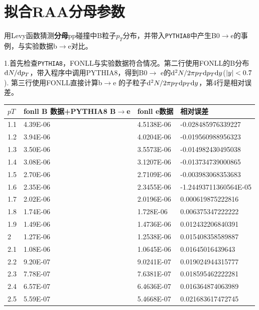 \documentclass{ctexart}
\begin{document}
\section{拟合RAA分母参数} %
\label{sec:拟合raa分母参数}

用Levy函数猜测\textbf{分母}pp碰撞中B粒子$p_T$分布，并带入\texttt{PYTHIA8}中产生B0$\to$e的事例，与实验数据b$\to$e\cite{Aidala:2019hib}对比。\par
1.首先检查\texttt{PYTHIA8}，FONLL与实验数据符合情况。第二行使用FONLL的B分布$\mathrm{d} N/\mathrm{d} p_T$，带入程序中调用PYTHIA8，得到B0$\to$ e的$\mathrm{d} ^2N/2\pi p_T\mathrm{d} p_T\mathrm{d} y$(${\abs{y}<0.7}$). 第三行使用FONLL直接计算b$\to$e 的子粒子$\mathrm{d} ^2N/2\pi p_T\mathrm{d} p_T\mathrm{d} y$，第4行是相对误差。
\begin{longtable}{l|lll}\hline
$pT$ & fonll B 数据+PYTHIA8 B$\to$e & fonll e数据  & 相对误差                  \\\hline
1.1  & 4.39E-06                  & 4.5138E-06 & -0.028485976339227    \\
1.2  & 3.94E-06                  & 4.0204E-06 & -0.019560988956323    \\
1.3  & 3.50E-06                  & 3.5573E-06 & -0.014982430495038    \\
1.4  & 3.08E-06                  & 3.1207E-06 & -0.013734739000865    \\
1.5  & 2.70E-06                  & 2.7109E-06 & -0.003983068353683    \\
1.6  & 2.35E-06                  & 2.3455E-06 & -1.24493711360564E-05 \\
1.7  & 2.02E-06                  & 2.0196E-06 & 0.000619875222816     \\
1.8  & 1.74E-06                  & 1.728E-06  & 0.006375347222222     \\
1.9  & 1.49E-06                  & 1.4736E-06 & 0.012432206840391     \\
2    & 1.27E-06                  & 1.2538E-06 & 0.015408358589887     \\
2.1  & 1.08E-06                  & 1.0645E-06 & 0.01645016439643      \\
2.2  & 9.20E-07                  & 9.0241E-07 & 0.019024944315777     \\
2.3  & 7.78E-07                  & 7.6381E-07 & 0.018595462222281     \\
2.4  & 6.57E-07                  & 6.4636E-07 & 0.016364874063989     \\
2.5  & 5.59E-07                  & 5.4668E-07 & 0.021683617472745     \\

\end{longtable}
\end{document}
